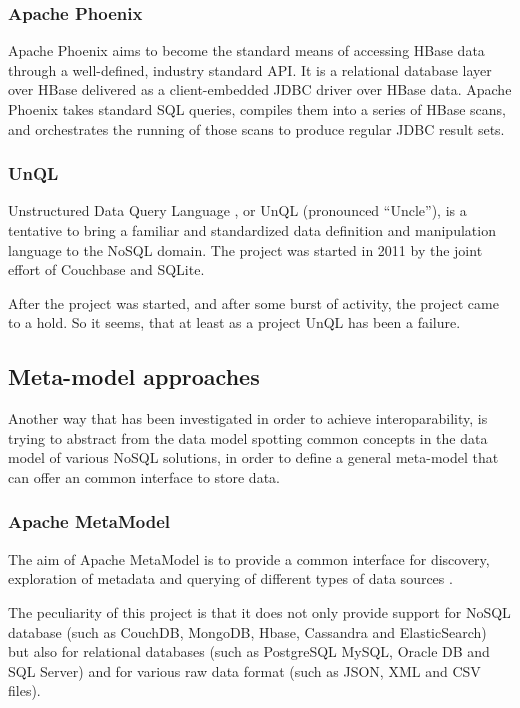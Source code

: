 \subsubsection{Apache Phoenix} 
Apache Phoenix \cite{online:apache-phoenix} aims to become the standard means of accessing HBase data through a well-defined, industry standard API.
It is a relational database layer over HBase delivered as a client-embedded JDBC driver over HBase data. Apache Phoenix takes standard SQL queries, compiles them into a series of HBase scans, and orchestrates the running of those scans to produce regular JDBC result sets. 

\subsubsection{UnQL}  
Unstructured Data Query Language \cite{online:unql}, or UnQL (pronounced “Uncle”), is a tentative to bring a familiar and standardized data definition and manipulation language to the NoSQL domain. The project was started in 2011 by the joint effort of Couchbase and SQLite.

\noindent After the project was started, and after some burst of activity, the project came to a hold. So it seems, that at least as a project UnQL has been a failure. 

\subsection{Meta-model approaches}
Another way that has been investigated in order to achieve interoparability,  is trying to abstract from the data model spotting common concepts in the data model of various NoSQL solutions, in order to define a general meta-model that can offer an common interface to store data.

\subsubsection{Apache MetaModel}
The aim of Apache MetaModel is to provide a common interface for discovery, exploration of metadata and querying of different types of data sources \cite{online:apache-metamodel}.

\noindent The peculiarity of this project is that it does not only provide support for NoSQL database (such as CouchDB, MongoDB, Hbase, Cassandra and ElasticSearch) but also for relational databases (such as PostgreSQL MySQL, Oracle DB and SQL Server) and for various raw data format (such as JSON, XML and CSV files).
 
